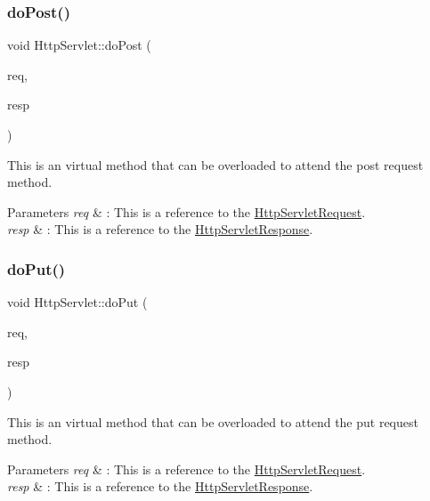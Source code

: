 \subsubsection{\texorpdfstring{do\+Post()}{doPost()}}
{\footnotesize\ttfamily void Http\+Servlet\+::do\+Post (\begin{DoxyParamCaption}\item[{\hyperlink{class_http_servlet_request}{Http\+Servlet\+Request} \&}]{req,  }\item[{\hyperlink{class_http_servlet_response}{Http\+Servlet\+Response} \&}]{resp }\end{DoxyParamCaption})\hspace{0.3cm}{\ttfamily [virtual]}}



This is an virtual method that can be overloaded to attend the post request method. 


\begin{DoxyParams}{Parameters}
{\em req} & \+: This is a reference to the \hyperlink{class_http_servlet_request}{Http\+Servlet\+Request}. \\
\hline
{\em resp} & \+: This is a reference to the \hyperlink{class_http_servlet_response}{Http\+Servlet\+Response}. \\
\hline
\end{DoxyParams}
\mbox{\label{class_http_servlet_a33edf48c6762b1c9f5e7faaf47135073}} 
\subsubsection{\texorpdfstring{do\+Put()}{doPut()}}
{\footnotesize\ttfamily void Http\+Servlet\+::do\+Put (\begin{DoxyParamCaption}\item[{\hyperlink{class_http_servlet_request}{Http\+Servlet\+Request} \&}]{req,  }\item[{\hyperlink{class_http_servlet_response}{Http\+Servlet\+Response} \&}]{resp }\end{DoxyParamCaption})\hspace{0.3cm}{\ttfamily [virtual]}}



This is an virtual method that can be overloaded to attend the put request method. 


\begin{DoxyParams}{Parameters}
{\em req} & \+: This is a reference to the \hyperlink{class_http_servlet_request}{Http\+Servlet\+Request}. \\
\hline
{\em resp} & \+: This is a reference to the \hyperlink{class_http_servlet_response}{Http\+Servlet\+Response}. \\
\hline
\end{DoxyParams}
\mbox{\label{class_http_servlet_a42a6a6a556f43b3447d4ff56d9d574cb}} 
